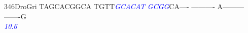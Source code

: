 \documentclass[11pt,twoside,reqno,a4paper]{article}
\begin{document}
{346\hspace*{1\charwidth}DroGri	TAGCACGGCA	TGTT\textit{\textcolor{Blue}{G}}\textit{\textcolor{Blue}{C}}\textit{\textcolor{Blue}{A}}\textit{\textcolor{Blue}{C}}\textit{\textcolor{Blue}{A}}\textit{\textcolor{Blue}{T}}	\textit{\textcolor{Blue}{G}}\textit{\textcolor{Blue}{C}}\textit{\textcolor{Blue}{G}}\textit{\textcolor{Blue}{G}}CA----	----------	A---------	-------G\\
\hspace*{4\charwidth}\hspace*{7\charwidth}\hspace*{1\charwidth}\hspace*{14\charwidth}\textit{\textcolor{Blue}{10.6}}\hspace*{1\charwidth}\hspace*{1\charwidth}\hspace*{1\charwidth}\hspace*{1\charwidth}\\
\\
}
\end{document}
